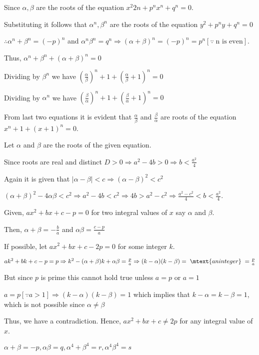   Since $\alpha, \beta$ are the roots of the equation $x^2{2n} + p^nx^n + q^n = 0$.

  Substituting it follows that $\alpha^n, \beta^n$ are the roots of the equation $y^2 + p^ny + q^n = 0$

  $\therefore \alpha^n + \beta^n = (-p)^n$ and $\alpha^n\beta^n = q^n\Rightarrow (\alpha + \beta)^n = (-p)^n
  = p^n [\because\;\text{n is even}]$.

  Thus, $\alpha^n + \beta^n + (\alpha + \beta)^n = 0$

  Dividing by $\beta^n$ we have $\left(\frac{\alpha}{\beta}\right)^n + 1 + \left(\frac{\alpha}{\beta} + 1\right)^n = 0$

  Dividing by $\alpha^n$ we have
  $\left(\frac{\beta}{\alpha}\right)^n + 1 + \left(\frac{\beta}{\alpha} + 1\right)^n = 0$

  From last two equations it is evident that $\frac{\alpha}{\beta}$ and $\frac{\beta}{\alpha}$ are roots
  of the equation $x^n + 1 + (x + 1)^n = 0$.
\item Let $\alpha$ and $\beta$ are the roots of the given equation.

  Since roots are real and distinct $D > 0 \Rightarrow a^2 - 4b > 0 \Rightarrow b < \frac{a^2}{4}$

  Again it is given that $|\alpha - \beta| < c \Rightarrow (\alpha - \beta)^2 < c^2$

  $(\alpha + \beta)^2 - 4\alpha\beta < c^2 \Rightarrow a^2 - 4b < c^2 \Rightarrow 4b > a^2 - c^2\Rightarrow
  \frac{a^2 - c^2}{4} < b < \frac{a^2}{4}$.
\item Given, $ax^2 + bx + c - p = 0$ for two integral values of $x$ say $\alpha$ and $\beta$.

  Then, $\alpha + \beta = -\frac{b}{a}$ and $\alpha\beta = \frac{c - p}{a}$

  If possible, let $ax^2 + bx + c - 2p = 0$ for some integer $k$.

  $ak^2 + bk + c - p = p \Rightarrow k^2 - (\alpha + \beta)k + \alpha\beta = \frac{p}{a}\Rightarrow (k -
  \alpha)(k - \beta) =\;\mtext{an integer}\;= \frac{p}{a}$

  But since $p$ is prime this cannot hold true unless $a = p$ or $a = 1$

  $a = p [\because a > 1]\Rightarrow (k - \alpha)(k - \beta) = 1$ which implies that $k - \alpha = k - \beta
  = 1$,
  which is not possible since $\alpha \ne \beta$

  Thus, we have a contradiction. Hence, $ax^2 + bx + c \ne 2p$ for any integral value of $x$.
\item $\alpha + \beta = -p, \alpha\beta = q, \alpha^4 + \beta^4 = r, \alpha^4\beta^4 = s$

